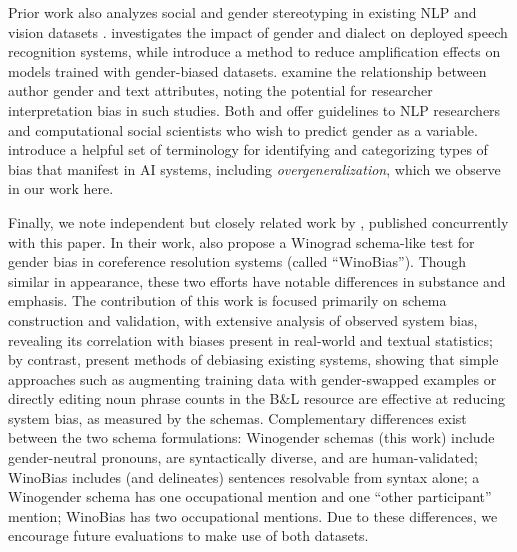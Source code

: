 \documentclass[11pt,a4paper]{article}
\begin{document}
Prior work also analyzes social and gender stereotyping in existing NLP and vision datasets \cite{van2016stereotyping,rudinger-may-vandurme:2017:EthNLP}.  investigates the impact of gender and dialect on deployed speech recognition systems, while  introduce a method to reduce amplification effects on models trained with gender-biased datasets.  examine the relationship between author gender and text attributes, noting the potential for researcher interpretation bias in such studies.
Both  and  offer guidelines to NLP researchers and computational social scientists who wish to predict gender as a variable.  introduce a helpful set of terminology for identifying and categorizing types of bias that manifest in AI systems, including \textit{overgeneralization}, which we observe in our work here.

Finally, we note independent but closely related work by , published concurrently with this paper. In their work,  also propose a Winograd schema-like test for gender bias in coreference resolution systems (called ``WinoBias''). Though similar in appearance, these two efforts have notable differences in substance and emphasis. The contribution of this work is focused primarily on schema construction and validation, with extensive analysis of  observed system bias, revealing its correlation with biases present in real-world and textual statistics; by contrast,  present methods of debiasing existing systems, showing that simple approaches such as augmenting training data with gender-swapped examples or directly editing noun phrase counts in the B\&L resource are effective at reducing system bias, as measured by the schemas. Complementary differences exist between the two schema formulations: Winogender schemas (this work) include gender-neutral pronouns, are syntactically diverse, and are human-validated; WinoBias includes (and delineates) sentences resolvable from syntax alone; a Winogender schema has one occupational mention and one ``other participant'' mention; WinoBias has two occupational mentions. Due to these differences, we encourage future evaluations to make use of both datasets.
\end{document}
